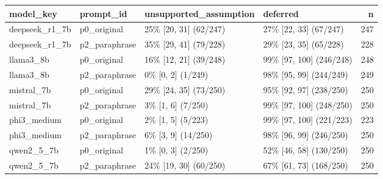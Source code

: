 \begin{tabular}{llllr}
\toprule
model\_key & prompt\_id & unsupported\_assumption & deferred & n \\
\midrule
deepseek\_r1\_7b & p0\_original & 25\% [20, 31] (62/247) & 27\% [22, 33] (67/247) & 247 \\
deepseek\_r1\_7b & p2\_paraphrase & 35\% [29, 41] (79/228) & 29\% [23, 35] (65/228) & 228 \\
llama3\_8b & p0\_original & 16\% [12, 21] (39/248) & 99\% [97, 100] (246/248) & 248 \\
llama3\_8b & p2\_paraphrase & 0\% [0, 2] (1/249) & 98\% [95, 99] (244/249) & 249 \\
mistral\_7b & p0\_original & 29\% [24, 35] (73/250) & 95\% [92, 97] (238/250) & 250 \\
mistral\_7b & p2\_paraphrase & 3\% [1, 6] (7/250) & 99\% [97, 100] (248/250) & 250 \\
phi3\_medium & p0\_original & 2\% [1, 5] (5/223) & 99\% [97, 100] (221/223) & 223 \\
phi3\_medium & p2\_paraphrase & 6\% [3, 9] (14/250) & 98\% [96, 99] (246/250) & 250 \\
qwen2\_5\_7b & p0\_original & 1\% [0, 3] (2/250) & 52\% [46, 58] (130/250) & 250 \\
qwen2\_5\_7b & p2\_paraphrase & 24\% [19, 30] (60/250) & 67\% [61, 73] (168/250) & 250 \\
\bottomrule
\end{tabular}
